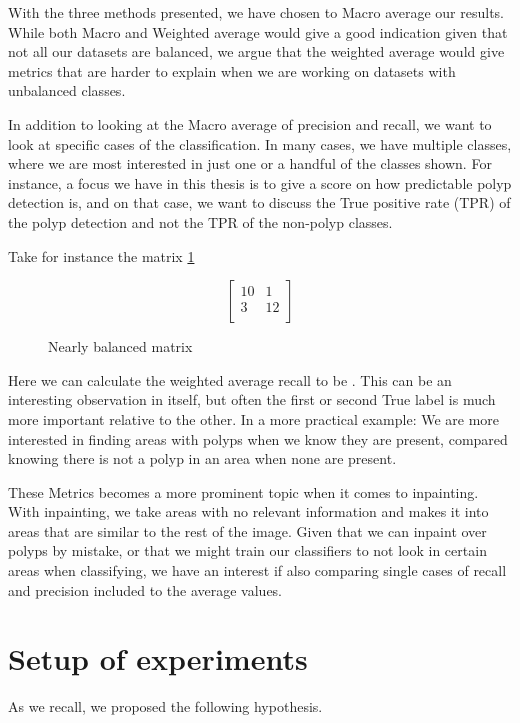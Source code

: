 With the three methods presented, we have chosen to Macro average our results. While both Macro and Weighted average would give a good indication given that not all our datasets are balanced, we argue that the weighted average would give metrics that are harder to explain when we are working on datasets with unbalanced classes.

In addition to looking at the Macro average of precision and recall, we want to look at specific cases of the classification.  In many cases, we have multiple classes, where we are most interested in just one or a handful of the classes shown. 
For instance, a focus we have in this thesis is to give a score on how predictable polyp detection is, and on that case, we want to discuss the True positive rate (TPR) of the polyp detection and not the TPR of the non-polyp classes. 

Take for instance the matrix \ref{mat:exampleMAT}\\
\begin{figure}[h]
    \centering
	\[
	\begin{bmatrix}
	 10 & 1 \\
	 3 & 12 \\
	\end{bmatrix}
	\]
    \caption{Nearly balanced matrix}
    \label{mat:exampleMAT}
\end{figure}



Here we can calculate the weighted average recall to be . This can be an interesting observation in itself, but often the first or second True label is much more important relative to the other.  In a more practical example: We are more interested in finding areas with polyps when we know they are present, compared knowing there is not a polyp in an area when none are present. 

These Metrics becomes a more prominent topic when it comes to inpainting. With inpainting, we take areas with no relevant information and makes it into areas that are similar to the rest of the image. Given that we can inpaint over polyps by mistake, or that we might train our classifiers to not look in certain areas when classifying, we have an interest if also comparing single cases of recall and precision included to the average values.





\section{Setup of experiments}
As we recall, we proposed the following hypothesis.
\vspace{10px}

